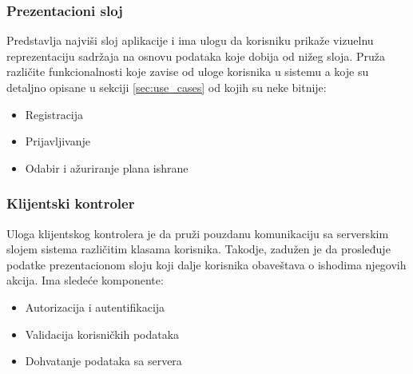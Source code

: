\subsubsection{Prezentacioni sloj}
Predstavlja najviši sloj aplikacije i ima ulogu da korisniku prikaže vizuelnu reprezentaciju sadržaja na osnovu podataka koje dobija od nižeg sloja. Pruža različite funkcionalnosti koje zavise od uloge korisnika u sistemu a koje su detaljno opisane u sekciji \ref{sec:use_cases} od kojih su neke bitnije:
\begin{itemize}
\item Registracija
\item Prijavljivanje
\item Odabir i ažuriranje plana ishrane
\end{itemize}


\subsubsection{Klijentski kontroler}
Uloga klijentskog kontrolera je da pruži pouzdanu komunikaciju sa serverskim slojem sistema različitim klasama korisnika. Takodje, zadužen je da prosleđuje podatke prezentacionom sloju koji dalje korisnika obaveštava o ishodima njegovih akcija. Ima sledeće komponente: 
\begin{itemize}
    \item Autorizacija i autentifikacija
    \item Validacija korisničkih podataka
    \item Dohvatanje podataka sa servera
\end{itemize}
